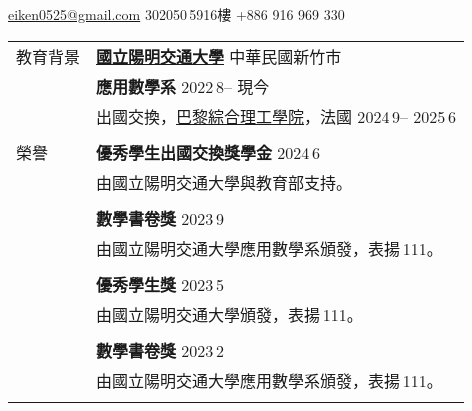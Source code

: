 \documentclass[letterpaper, 11pt]{article}
\newcommand{\ms}{\,}
\begin{document}
\begin{CJK*}{UTF8}{bkai}


\vspace{0.4cm}

\href{mailto:eiken0525@gmail.com}{eiken0525@gmail.com} \hfill
302050\ms5916樓\hfill
+886 916 969 330 \quad\ 

\vspace{0.2cm}


\setlength{\tabcolsep}{8pt}
\vspace{-1.5em}
\begin{center}
    \begin{longtable}{p{0.72in}p{5.97in}}
        
        
        \textcolor{OliveGreen}{教育背景} 
        & \href{https://www.nycu.edu.tw/nycu/en/index}{\textbf{國立陽明交通大學}} \hfill 中華民國新竹市 \\ 
        & \textbf{應用數學系}
            \hfill 2022\ms8 -- 現今 \\
        & \qquad 出國交換，\href{https://www.polytechnique.edu}{巴黎綜合理工學院}，法國 \hfill 2024\ms9 -- 2025\ms6 \\
        & \\
        
        
        {\textcolor{OliveGreen}{榮譽}}        & \textbf{優秀學生出國交換獎學金} \hfill 2024\ms6\\
        & 由國立陽明交通大學與教育部支持。 \\
        & \\
        & \textbf{數學書卷獎} \hfill 2023\ms9\\
        & 由國立陽明交通大學應用數學系頒發，表揚\ms111。\\
        & \\
        & \textbf{優秀學生獎} \hfill 2023\ms5\\
        & 由國立陽明交通大學頒發，表揚\ms111。\\
        & \\
        & \textbf{數學書卷獎} \hfill 2023\ms2\\
        & 由國立陽明交通大學應用數學系頒發，表揚\ms111。\\
        & \\


\end{longtable}
\end{center}
\end{CJK*}
\end{document}
